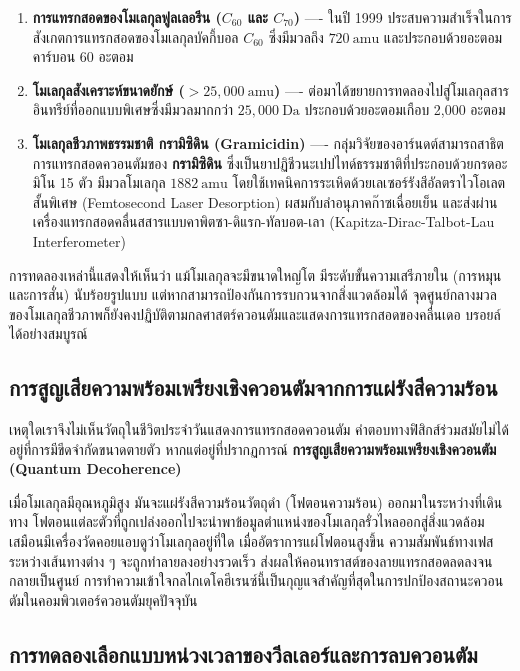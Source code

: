 \begin{enumerate}
    \item \textbf{การแทรกสอดของโมเลกุลฟูลเลอรีน ($C_{60}$ และ $C_{70}$)} ---- ในปี 1999 ประสบความสำเร็จในการสังเกตการแทรกสอดของโมเลกุลบัคกี้บอล $C_{60}$ ซึ่งมีมวลถึง $720~\text{amu}$ และประกอบด้วยอะตอมคาร์บอน 60 อะตอม
    \item \textbf{โมเลกุลสังเคราะห์ขนาดยักษ์ ($>25{,}000~\text{amu}$)} ---- ต่อมาได้ขยายการทดลองไปสู่โมเลกุลสารอินทรีย์ที่ออกแบบพิเศษซึ่งมีมวลมากกว่า $25{,}000~\text{Da}$ ประกอบด้วยอะตอมเกือบ 2,000 อะตอม
    \item \textbf{โมเลกุลชีวภาพธรรมชาติ กรามิซิดิน (Gramicidin)} ---- กลุ่มวิจัยของอาร์นดต์สามารถสาธิตการแทรกสอดควอนตัมของ \textbf{กรามิซิดิน} ซึ่งเป็นยาปฏิชีวนะเปปไทด์ธรรมชาติที่ประกอบด้วยกรดอะมิโน 15 ตัว มีมวลโมเลกุล $1882~\text{amu}$ โดยใช้เทคนิคการระเหิดด้วยเลเซอร์รังสีอัลตราไวโอเลตสั้นพิเศษ (Femtosecond Laser Desorption) ผสมกับลำอนุภาคก๊าซเฉื่อยเย็น และส่งผ่านเครื่องแทรกสอดคลื่นสสารแบบคาพิตซา-ดิแรก-ทัลบอต-เลา (Kapitza-Dirac-Talbot-Lau Interferometer)
\end{enumerate}

การทดลองเหล่านี้แสดงให้เห็นว่า แม้โมเลกุลจะมีขนาดใหญ่โต มีระดับขั้นความเสรีภายใน (การหมุนและการสั่น) นับร้อยรูปแบบ แต่หากสามารถป้องกันการรบกวนจากสิ่งแวดล้อมได้ จุดศูนย์กลางมวลของโมเลกุลชีวภาพก็ยังคงปฏิบัติตามกลศาสตร์ควอนตัมและแสดงการแทรกสอดของคลื่นเดอ บรอยล์ได้อย่างสมบูรณ์

\subsection{การสูญเสียความพร้อมเพรียงเชิงควอนตัมจากการแผ่รังสีความร้อน}

เหตุใดเราจึงไม่เห็นวัตถุในชีวิตประจำวันแสดงการแทรกสอดควอนตัม คำตอบทางฟิสิกส์ร่วมสมัยไม่ได้อยู่ที่การมีขีดจำกัดขนาดตายตัว หากแต่อยู่ที่ปรากฏการณ์ \textbf{การสูญเสียความพร้อมเพรียงเชิงควอนตัม (Quantum Decoherence)} 

เมื่อโมเลกุลมีอุณหภูมิสูง มันจะแผ่รังสีความร้อนวัตถุดำ (โฟตอนความร้อน) ออกมาในระหว่างที่เดินทาง โฟตอนแต่ละตัวที่ถูกเปล่งออกไปจะนำพาข้อมูลตำแหน่งของโมเลกุลรั่วไหลออกสู่สิ่งแวดล้อม เสมือนมีเครื่องวัดคอยแอบดูว่าโมเลกุลอยู่ที่ใด เมื่ออัตราการแผ่โฟตอนสูงขึ้น ความสัมพันธ์ทางเฟสระหว่างเส้นทางต่าง ๆ จะถูกทำลายลงอย่างรวดเร็ว ส่งผลให้คอนทราสต์ของลายแทรกสอดลดลงจนกลายเป็นศูนย์ การทำความเข้าใจกลไกเดโคฮีเรนซ์นี้เป็นกุญแจสำคัญที่สุดในการปกป้องสถานะควอนตัมในคอมพิวเตอร์ควอนตัมยุคปัจจุบัน

\subsection{การทดลองเลือกแบบหน่วงเวลาของวีลเลอร์และการลบควอนตัม}

